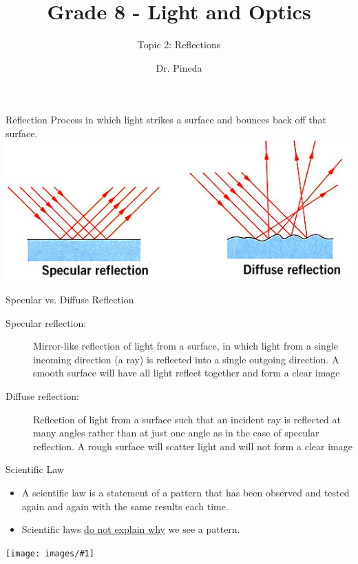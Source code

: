 \documentclass[t]{beamer}
\title[Topic 2]{Grade 8 - Light and Optics} %
\subtitle{Topic 2: Reflections}
\author{Dr. Pineda}
\institute[] {\href{http://www.drpineda.ca}{www.drpineda.ca}}
\date{} %
\newcommand{\img}[1]{\texttt{[image: images/\#1]}}
\newcommand{\bi}{\begin{itemize}}
\newcommand{\ei}{\end{itemize}}
\begin{document}
{
\frame{\titlepage}
}


\begin{frame}{Reflection}
Process in which light strikes a surface and bounces back off that surface. 
\includegraphics[width=1\linewidth]{images/specularreflection.jpg}
\end{frame}

\begin{frame}{Specular vs. Diffuse Reflection}

\begin{description}
\item[Specular reflection:]  Mirror-like reflection of light from a surface, in which light from a single incoming direction (a ray) is reflected into a single outgoing direction. A smooth surface will have all light reflect together and form a clear image

\item[Diffuse reflection:]  Reflection of light from a surface such that an incident ray is reflected at many angles rather than at just one angle as in the case of specular reflection. A rough surface will scatter light and will not form a clear image
\end{description}
\end{frame}

\begin{frame}{Scientific Law}
\bi
\item A scientific law is a statement of a pattern that has been observed and tested again and again with the same results each time. \item Scientific laws \underline{do not explain why} we see a pattern.
\ei
\img{law-of-gravity-enforced.jpg}
\end{frame}
\end{document}
